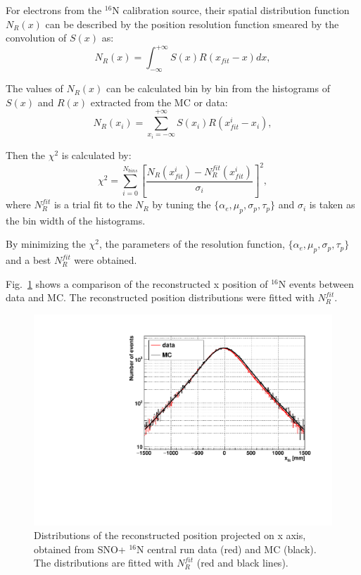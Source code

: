 For electrons from the $^{16}$N calibration source, their spatial distribution function $N_{R}(x)$ can be described by the position resolution function smeared by the convolution of $S(x)$ as\cite{boulay2004direct}:
\begin{equation}
N_{R}(x)=\int^{+\infty}_{-\infty} S(x)R(x_{fit}-x)dx,
\end{equation}

The values of $N_{R}(x)$ can be calculated bin by bin from the histograms of $S(x)$ and $R(x)$ extracted from the MC or data: 
\begin{equation}
N_R(x_i)=\sum_{x_i=-\infty}^{+\infty}S(x_i)R(x_{fit}^i-x_i),
\end{equation}

Then the $\chi^2$ is calculated by:
\begin{equation}
\chi^2=\sum^{N_{bins}}_{i=0}[\frac{N_R(x_{fit}^i)-N_R^{fit}(x_{fit}^i)}{\sigma_i}]^2,
\end{equation}
where $N_R^{fit}$ is a trial fit to the $N_R$ by tuning the $\{\alpha_e,\mu_p,\sigma_p,\tau_p\}$ and $\sigma_i$ is taken as the bin width of the histograms.

By minimizing the $\chi^2$, the parameters of the resolution function, $\{\alpha_e,\mu_p,\sigma_p,\tau_p\}$ and a best $N_R^{fit}$ were obtained.

Fig.~\ref{fig:posresol} shows a comparison of the reconstructed x position of {$^{16}$}N events between data and MC. The reconstructed position distributions were fitted with $N_R^{fit}$.

\begin{figure}
	\centering
	\includegraphics[width=140mm]{posResol.pdf}
	\caption[Distributions of the reconstructed position projected on x axis.]{Distributions of the reconstructed position projected on x axis, obtained from SNO+ {$^{16}$}N central run data (red) and MC (black). The distributions are fitted with $N_R^{fit}$ (red and black lines).}
	\label{fig:posresol}
\end{figure}

